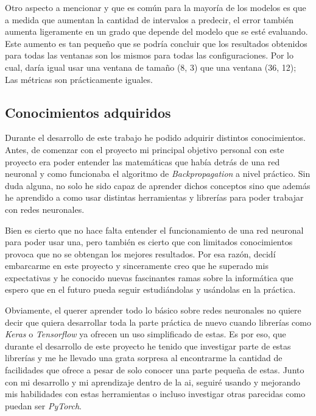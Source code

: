 Otro aspecto a mencionar y que es común para la mayoría de los modelos es que a medida que aumentan la cantidad de intervalos a predecir, el error también aumenta ligeramente en un grado que depende del modelo que se esté evaluando. Este aumento es tan pequeño que se podría concluir que los resultados obtenidos para todas las ventanas son los mismos para todas las configuraciones. Por lo cual, daría igual usar una ventana de tamaño (8, 3) que una ventana (36, 12); Las métricas son prácticamente iguales.


\subsection{Conocimientos adquiridos}

Durante el desarrollo de este trabajo he podido adquirir distintos conocimientos. Antes, de comenzar con el proyecto mi principal objetivo personal con este proyecto era poder entender las matemáticas que había detrás de una red neuronal y como funcionaba el algoritmo de \textit{Backpropagation} a nivel práctico. Sin duda alguna, no solo he sido capaz de aprender dichos conceptos sino que además he aprendido a como usar distintas herramientas y librerías para poder trabajar con redes neuronales.
\newline

Bien es cierto que no hace falta entender el funcionamiento de una red neuronal para poder usar una, pero también es cierto que con limitados conocimientos provoca que no se obtengan los mejores resultados. Por esa razón, decidí embarcarme en este proyecto y sinceramente creo que he superado mis expectativas y he conocido nuevas fascinantes ramas sobre la informática que espero que en el futuro pueda seguir estudiándolas y usándolas en la práctica.
\newline

Obviamente, el querer aprender todo lo básico sobre redes neuronales no quiere decir que quiera desarrollar toda la parte práctica de nuevo cuando librerías como \textit{Keras} o \textit{Tensorflow} ya ofrecen un uso simplificado de estas. Es por eso, que durante el desarrollo de este proyecto he tenido que investigar parte de estas librerías y me he llevado una grata sorpresa al encontrarme la cantidad de facilidades que ofrece a pesar de solo conocer una parte pequeña de estas. Junto con mi desarrollo y mi aprendizaje dentro de la \acrshort{ai}, seguiré usando y mejorando mis habilidades con estas herramientas o incluso investigar otras parecidas como puedan ser \textit{PyTorch}.
\newline

